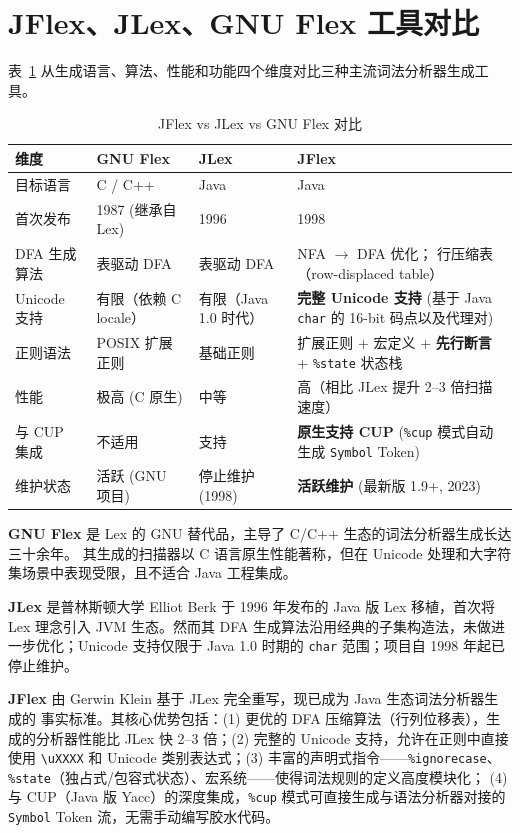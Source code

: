 \documentclass[a4paper]{article}
\begin{document}
\section{JFlex、JLex、GNU Flex 工具对比}

表~\ref{tab:tool-compare} 从生成语言、算法、性能和功能四个维度对比三种主流词法分析器生成工具。

\begin{table}[H]
\centering
\caption{JFlex vs JLex vs GNU Flex 对比}
\label{tab:tool-compare}
\begin{tabular}{@{}p{3cm}p{3.5cm}p{3.5cm}p{4cm}@{}}
\toprule
\textbf{维度} & \textbf{GNU Flex} & \textbf{JLex} & \textbf{JFlex} \\
\midrule
目标语言 & C / C++ & Java & Java \\
\midrule
首次发布 & 1987 (继承自 Lex) & 1996 & 1998 \\
\midrule
DFA 生成算法 & 表驱动 DFA & 表驱动 DFA & NFA $\to$ DFA 优化；
行压缩表（row-displaced table） \\
\midrule
Unicode 支持 & 有限（依赖 C locale）& 有限（Java 1.0 时代）& \textbf{完整 Unicode 支持}
(基于 Java \texttt{char} 的 16-bit 码点以及代理对) \\
\midrule
正则语法 & POSIX 扩展正则 & 基础正则 & 扩展正则 + 宏定义 +
\textbf{先行断言} + \texttt{\%state} 状态栈 \\
\midrule
性能 & 极高 (C 原生) & 中等 & 高（相比 JLex
提升 2--3 倍扫描速度） \\
\midrule
与 CUP 集成 & 不适用 & 支持 & \textbf{原生支持 CUP}
(\texttt{\%cup} 模式自动生成
\texttt{Symbol} Token) \\
\midrule
维护状态 & 活跃 (GNU 项目) & 停止维护 (1998) & \textbf{活跃维护}
(最新版 1.9+, 2023) \\
\bottomrule
\end{tabular}
\end{table}

\textbf{GNU Flex} 是 Lex 的 GNU 替代品，主导了 C/C++ 生态的词法分析器生成长达三十余年。
其生成的扫描器以 C 语言原生性能著称，但在 Unicode 处理和大字符集场景中表现受限，且不适合
Java 工程集成。

\textbf{JLex} 是普林斯顿大学 Elliot Berk 于 1996 年发布的 Java 版 Lex 移植，首次将
Lex 理念引入 JVM 生态。然而其 DFA 生成算法沿用经典的子集构造法，未做进一步优化；Unicode
支持仅限于 Java 1.0 时期的 \texttt{char} 范围；项目自 1998 年起已停止维护。

\textbf{JFlex} 由 Gerwin Klein 基于 JLex 完全重写，现已成为 Java 生态词法分析器生成的
事实标准。其核心优势包括：(1) 更优的 DFA 压缩算法（行列位移表），生成的分析器性能比 JLex
快 2--3 倍；(2) 完整的 Unicode 支持，允许在正则中直接使用 \texttt{\textbackslash uXXXX}
和 Unicode 类别表达式；(3) 丰富的声明式指令——\texttt{\%ignorecase}、
\texttt{\%state}（独占式/包容式状态）、宏系统——使得词法规则的定义高度模块化；
(4) 与 CUP（Java 版 Yacc）的深度集成，\texttt{\%cup} 模式可直接生成与语法分析器对接的
\texttt{Symbol} Token 流，无需手动编写胶水代码。
\end{document}
